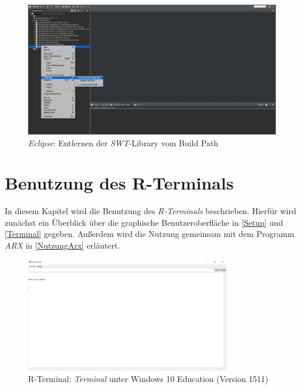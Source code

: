 \documentclass[a4paper, 12pt]{report} %
\begin{document}
\begin{figure}[t]
	\centering
		\includegraphics[width=\linewidth]{Bilder/SWT-Remove-from-Build-Path}
    	\caption{\textit{Eclipse}: Entfernen der \textit{SWT}-Library vom Build Path}
    	\label{removeFromBuildPath}
\end{figure}

 
\section{Benutzung des R-Terminals}

In diesem Kapitel wird die Benutzung des \textit{R-Terminals} beschrieben. Hierfür wird zunächst ein Überblick über die graphische Benutzeroberfläche in \ref{Setup} und \ref{Terminal} gegeben. Außerdem wird die Nutzung gemeinsam mit dem Programm \textit{ARX} in \ref{NutzungArx} erläutert.\\

\begin{figure}[htpb]
\centering
\includegraphics[width=0.8\textwidth]{Bilder/rterminalwindows}
\caption{R-Terminal: \textit{Terminal} unter Windows 10 Education (Version 1511)}
\label{rterminalwindows}
\end{figure}
\end{document}
